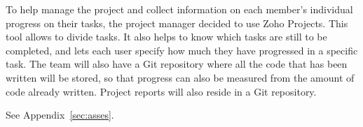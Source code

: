 
To help manage the project and collect information on each member's individual progress on their tasks, the project manager decided to use Zoho Projects. This tool allows to divide tasks.  It also helps to know which tasks are still to be completed, and lets each user specify how much they have progressed in a specific task. The team will also have a Git repository where all the code that has been written will be stored, so that progress can also be measured from the amount of code already written. Project reports will also reside in a Git repository.

See Appendix~\ref{sec:asses}.